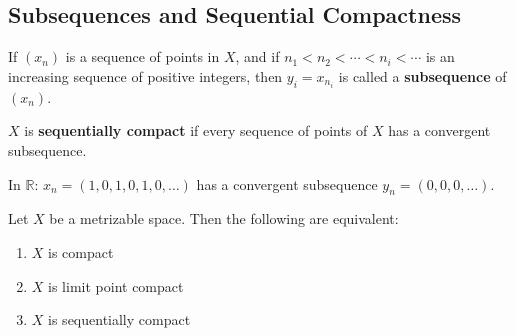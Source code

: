 \documentclass[11pt]{report}
\begin{document}
\subsection{Subsequences and Sequential Compactness}

\begin{defbox}[Subsequence]
If $(x_n)$ is a sequence of points in $X$, and if $n_1 < n_2 < \cdots < n_i < \cdots$ is an increasing sequence of positive integers, then $y_i = x_{n_i}$ is called a \textbf{subsequence} of $(x_n)$.
\end{defbox}

\begin{defbox}
$X$ is \textbf{sequentially compact} if every sequence of points of $X$ has a convergent subsequence.
\end{defbox}

\begin{exbox}
In $\mathbb{R}$: $x_n = (1, 0, 1, 0, 1, 0, \ldots)$ has a convergent subsequence $y_n = (0, 0, 0, \ldots)$.
\end{exbox}

\begin{thmbox}
Let $X$ be a metrizable space. Then the following are equivalent:
\begin{enumerate}
    \item $X$ is compact
    \item $X$ is limit point compact
    \item $X$ is sequentially compact
\end{enumerate}
\end{thmbox}
\end{document}
